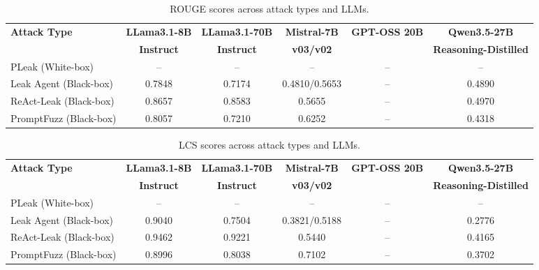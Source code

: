 \documentclass{article}
\begin{document}
\begin{table}[htbp]
\centering
\caption{ROUGE scores across attack types and LLMs.}
\label{tab:rouge}
\begin{adjustbox}{max width=\textwidth}
\begin{tabular}{lccccc}
\toprule
\textbf{Attack Type} & \textbf{LLama3.1-8B} & \textbf{LLama3.1-70B} & \textbf{Mistral-7B} & \textbf{GPT-OSS 20B} & \textbf{Qwen3.5-27B} \\
                      & \textbf{Instruct}     & \textbf{Instruct}      & \textbf{v03/v02}    &                       & \textbf{Reasoning-Distilled} \\
\midrule
PLeak (White-box)     & --     & --     & --              & -- & -- \\
Leak Agent (Black-box)& 0.7848 & 0.7174 & 0.4810/0.5653   & -- & 0.4890 \\
ReAct-Leak (Black-box)& 0.8657 & 0.8583 & 0.5655          & -- & 0.4970 \\
PromptFuzz (Black-box)& 0.8057 & 0.7210 & 0.6252          & -- & 0.4318 \\
\bottomrule
\end{tabular}
\end{adjustbox}
\end{table}

\begin{table}[htbp]
\centering
\caption{LCS scores across attack types and LLMs.}
\label{tab:lcs}
\begin{adjustbox}{max width=\textwidth}
\begin{tabular}{lccccc}
\toprule
\textbf{Attack Type} & \textbf{LLama3.1-8B} & \textbf{LLama3.1-70B} & \textbf{Mistral-7B} & \textbf{GPT-OSS 20B} & \textbf{Qwen3.5-27B} \\
                      & \textbf{Instruct}     & \textbf{Instruct}      & \textbf{v03/v02}    &                       & \textbf{Reasoning-Distilled} \\
\midrule
PLeak (White-box)     & --     & --     & --              & -- & -- \\
Leak Agent (Black-box)& 0.9040 & 0.7504 & 0.3821/0.5188   & -- & 0.2776 \\
ReAct-Leak (Black-box)& 0.9462 & 0.9221 & 0.5440          & -- & 0.4165 \\
PromptFuzz (Black-box)& 0.8996 & 0.8038 & 0.7102          & -- & 0.3702 \\
\bottomrule
\end{tabular}
\end{adjustbox}
\end{table}
\end{document}
